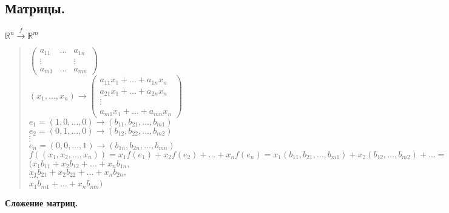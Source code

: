 \documentclass[12pt]{article}
\begin{document}
	\subsection{Матрицы.}
	\underline{$\mathbb{R}^n \xrightarrow{f} \mathbb{R}^m$}
	\begin{quote}
		$\left(
		\begin{smallmatrix}
			a_{11} & \dots & a_{1n} \\
			\vdots &  & \vdots \\
			a_{m1} & \dots & a_{mn}
		\end{smallmatrix}
		\right)$ \\
		$(x_1, \dots, x_n) \rightarrow \left(
		\begin{smallmatrix}
			a_{11}x_1 + \dots + a_{1n}x_n \\
			a_{21}x_1 + \dots + a_{2n}x_n \\
			\vdots \\
			a_{m1}x_1 + \dots + a_{mn}x_n
		\end{smallmatrix}
		\right)$ \\
		$e_1 = (1, 0, \dots, 0) \rightarrow (b_{11}, b_{21}, \dots, b_{m1})$ \\
		$e_2 = (0, 1, \dots, 0) \rightarrow (b_{12}, b_{22}, \dots, b_{m2})$ \\
		$\vdots$ \\
		$e_n = (0, 0, \dots, 1) \rightarrow (b_{1n}, b_{2n}, \dots, b_{mn})$ \\
		$f((x_1, x_2, \dots, x_n)) = x_1 f(e_1) + x_2 f(e_2) + \dots + x_n f(e_n) = x_1 (b_{11}, b_{21}, \dots, b_{m1}) + x_2 (b_{12}, \dots, b_{m2}) + \dots =$ \\
		$(x_1 b_{11} + x_2 b_{12} + \dots + x_n b_{1n},$ \\
		$x_1 b_{21} + x_2 b_{22} + \dots + x_n b_{2n},$ \\
		$\dots,$ \\
		$x_1 b_{m1} + \dots + x_n b_{mn})$
	\end{quote}
	\textbf{Сложение матриц.}
\end{document}
